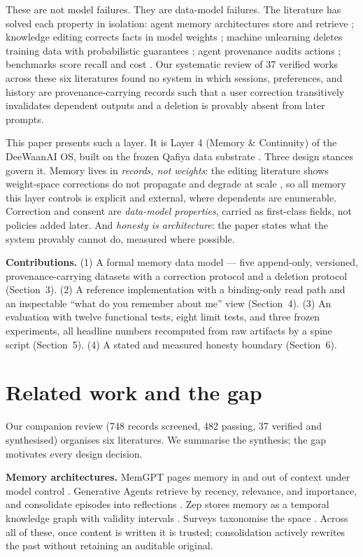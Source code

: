 \documentclass[11pt]{article}
\begin{document}
These are not model failures. They are data-model failures. The literature has solved each property in isolation: agent memory architectures store and retrieve \cite{memgpt,genagents,zep,memorysurvey}; knowledge editing corrects facts in model weights \cite{decao,rome,memit,kesurvey}; machine unlearning deletes training data with probabilistic guarantees \cite{ginart,sisa,athena}; agent provenance audits actions \cite{agenttrace,mapgraph}; benchmarks score recall and cost \cite{longmemeval,locomo,ragvslc}. Our systematic review of 37 verified works across these six literatures found no system in which sessions, preferences, and history are provenance-carrying records such that a user correction transitively invalidates dependent outputs and a deletion is provably absent from later prompts.

This paper presents such a layer. It is Layer 4 (Memory \& Continuity) of the DeeWaanAI OS, built on the frozen Qafiya data substrate \cite{qafiya}. Three design stances govern it. Memory lives in \emph{records, not weights}: the editing literature shows weight-space corrections do not propagate \cite{ripple,mquake} and degrade at scale \cite{editatscale}, so all memory this layer controls is explicit and external, where dependents are enumerable. Correction and consent are \emph{data-model properties}, carried as first-class fields, not policies added later. And \emph{honesty is architecture}: the paper states what the system provably cannot do, measured where possible.

\textbf{Contributions.} (1) A formal memory data model --- five append-only, versioned, provenance-carrying datasets with a correction protocol and a deletion protocol (Section~3). (2) A reference implementation with a binding-only read path and an inspectable ``what do you remember about me'' view (Section~4). (3) An evaluation with twelve functional tests, eight limit tests, and three frozen experiments, all headline numbers recomputed from raw artifacts by a spine script (Section~5). (4) A stated and measured honesty boundary (Section~6).

\section{Related work and the gap}
\label{sec:related}
Our companion review (748 records screened, 482 passing, 37 verified and synthesised) organises six literatures. We summarise the synthesis; the gap motivates every design decision.

\textbf{Memory architectures.} MemGPT pages memory in and out of context under model control \cite{memgpt}. Generative Agents retrieve by recency, relevance, and importance, and consolidate episodes into reflections \cite{genagents}. Zep stores memory as a temporal knowledge graph with validity intervals \cite{zep}. Surveys taxonomise the space \cite{memorysurvey,memorymatters}. Across all of these, once content is written it is trusted; consolidation actively rewrites the past without retaining an auditable original.
\end{document}
